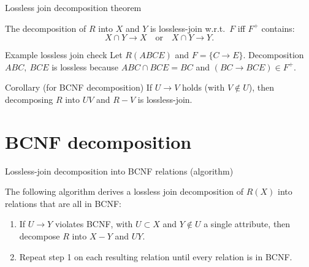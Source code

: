 \documentclass[10pt,aspectratio=169]{beamer}
\newenvironment{examplebox}[1][Example]{\begin{exampleblock}{#1}}{\end{exampleblock}}
\begin{document}
\begin{frame}{Lossless join decomposition theorem}
\begin{theorem}
The decomposition of \(R\) into \(X\) and \(Y\) is lossless-join w.r.t.\ \(F\) iff \(F^+\) contains:
\[
X\cap Y \rightarrow X \quad\text{or}\quad X\cap Y \rightarrow Y.
\]
\end{theorem}

\begin{examplebox}[Example lossless join check]
Let \(R(ABCE)\) and \(F=\{C\rightarrow E\}\). Decomposition \(ABC,\ BCE\) is lossless because \(ABC\cap BCE = BC\) and \((BC\rightarrow BCE)\in F^+\).
\end{examplebox}

\begin{alertblock}{Corollary (for BCNF decomposition)}
If \(U\rightarrow V\) holds (with \(V\notin U\)), then decomposing \(R\) into \(UV\) and \(R - V\) is lossless-join.
\end{alertblock}
\end{frame}

\section{BCNF decomposition}

\begin{frame}{Lossless-join decomposition into BCNF relations (algorithm)}
\begin{theorem}
The following algorithm derives a lossless join decomposition of \(R(X)\) into relations that are all in BCNF:
\begin{enumerate}
  \item If \(U \rightarrow Y\) violates BCNF, with \(U \subset X\) and \(Y \notin U\) a single attribute, then decompose \(R\) into \(X - Y\) and \(UY\).
  \item Repeat step 1 on each resulting relation until every relation is in BCNF.
\end{enumerate}
\end{theorem}
\end{frame}
\end{document}
